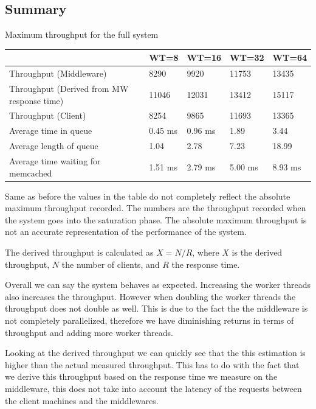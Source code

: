 \documentclass[11pt,a4paper]{article}
\begin{document}
\subsection{Summary}
%
\begin{center}
	{Maximum throughput for the full system}
	\begin{tabular}{|l|p{1.5cm}|p{1.5cm}|p{1.5cm}|p{1.5cm}|}
		\hline                                            & WT=8 & WT=16 & WT=32 & WT=64 \\ 
		\hline Throughput (Middleware)                    &  8290    &   9920    &   11753    &   13435    \\ 
		\hline Throughput (Derived from MW response time) &  11046   &   12031    &   13412    &   15117    \\ 
		\hline Throughput (Client)                        &  8254   &   9865    &    11693   &    13365   \\ 
		\hline Average time in queue                      &  0.45 ms   &    0.96 ms   &    1.89   &   3.44    \\ 
		\hline Average length of queue                    &  1.04   &  2.78    &    7.23    &   18.99    \\ 
		\hline Average time waiting for memcached         &  1.51 ms   &   2.79 ms    &    5.00 ms   &   8.93 ms    \\ 
		\hline 
	\end{tabular}
\end{center}
%
Same as before the values in the table do not completely reflect the absolute maximum throughput recorded.
%
The numbers are the throughput recorded when the system goes into the saturation phase.
%
The absolute maximum throughput is not an accurate representation of the performance of the system.
%
\par
%
The derived throughput is calculated as $X = N / R$, where $X$ is the derived throughput, $N$ the number of clients, and $R$ the response time.
%
\par
%
Overall we can say the system behaves as expected.
%
Increasing the worker threads also increases the throughput.
%
However when doubling the worker threads the throughput does not double as well.
%
This is due to the fact the the middleware is not completely parallelized, therefore we have diminishing returns in terms of throughput and adding more worker threads.
%
\par
%
Looking at the derived throughput we can quickly see that the this estimation is higher than the actual measured throughput.
%
This has to do with the fact that we derive this throughput based on the response time we measure on the middleware, this does not take into account the latency of the requests between the client machines and the middlewares.
\end{document}
